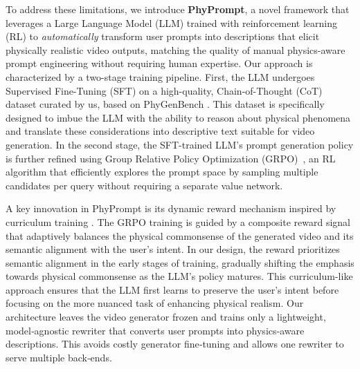 To address these limitations, we introduce \textbf{PhyPrompt}, a novel framework that leverages a Large Language Model (LLM) trained with reinforcement learning (RL) to \emph{automatically} transform user prompts into descriptions that elicit physically realistic video outputs, matching the quality of manual physics-aware prompt engineering without requiring human expertise.
Our approach is characterized by a two-stage training pipeline.
First, the LLM undergoes Supervised Fine-Tuning (SFT) on a high-quality, Chain-of-Thought (CoT) dataset curated by us, based on PhyGenBench \cite{meng2024towards}.
This dataset is specifically designed to imbue the LLM with the ability to reason about physical phenomena and translate these considerations into descriptive text suitable for video generation.
In the second stage, the SFT-trained LLM's prompt generation policy is further refined using Group Relative Policy Optimization (GRPO)~\cite{guo2025deepseek}, an RL algorithm that efficiently explores the prompt space by sampling multiple candidates per query without requiring a separate value network.

A key innovation in PhyPrompt is its dynamic reward mechanism inspired by curriculum training \cite{bengio2009curriculum}.
The GRPO training is guided by a composite reward signal that adaptively balances the physical commonsense of the generated video and its semantic alignment with the user's intent.
In our design, the reward prioritizes semantic alignment in the early stages of training, gradually shifting the emphasis towards physical commonsense as the LLM's policy matures.
This curriculum-like approach ensures that the LLM first learns to preserve the user's intent before focusing on the more nuanced task of enhancing physical realism.
Our architecture leaves the video generator frozen and trains only a lightweight, model‑agnostic rewriter that converts user prompts into physics‑aware descriptions.
This avoids costly generator fine‑tuning and allows one rewriter to serve multiple back‑ends.

